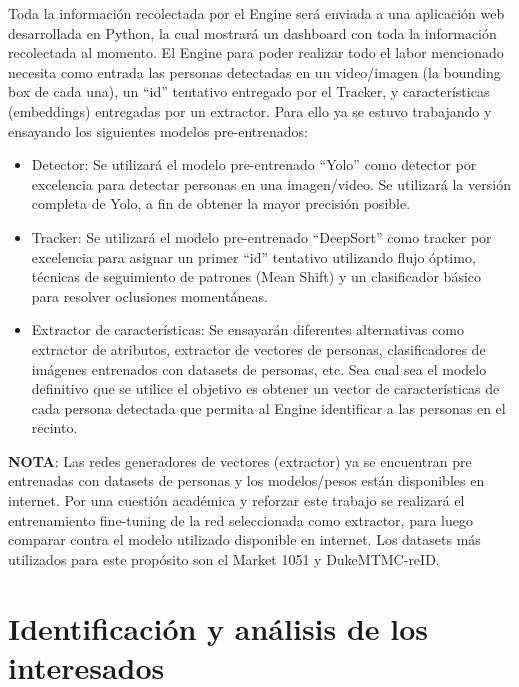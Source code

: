\documentclass[11pt]{charter}
\begin{document}
\newpage

Toda la información recolectada por el Engine será enviada a una aplicación web desarrollada en Python, la cual mostrará un dashboard con toda la información recolectada al momento. El Engine para poder realizar todo el labor mencionado necesita como entrada las personas detectadas en un video/imagen (la bounding box de cada una), un “id” tentativo entregado por el Tracker, y características (embeddings)  entregadas por un extractor. Para ello ya se estuvo trabajando y ensayando los siguientes modelos pre-entrenados:

\begin{itemize}
\item Detector: Se utilizará el modelo pre-entrenado “Yolo” como detector por excelencia para detectar personas en una imagen/video. Se utilizará la versión completa de Yolo, a fin de obtener la mayor precisión posible.
\item Tracker: Se utilizará el modelo pre-entrenado “DeepSort” como tracker por excelencia para asignar un primer “id” tentativo utilizando flujo óptimo, técnicas de seguimiento de patrones (Mean Shift) y un clasificador básico para resolver oclusiones momentáneas.
\item Extractor de características: Se ensayarán diferentes alternativas como extractor de atributos, extractor de vectores de personas, clasificadores de imágenes entrenados con datasets de personas, etc. Sea cual sea el modelo definitivo que se utilice el objetivo es obtener un vector de características de cada persona detectada que permita al Engine identificar a las personas en el recinto.
\end{itemize}

\textbf{NOTA}: Las redes generadores de vectores (extractor) ya se encuentran pre entrenadas con datasets de personas y los modelos/pesos están disponibles en internet. Por una cuestión académica y reforzar este trabajo se realizará el entrenamiento fine-tuning de la red seleccionada como extractor, para luego comparar contra el modelo utilizado disponible en internet. Los datasets más utilizados para este propósito son el Market 1051 y DukeMTMC-reID.


\section{Identificación y análisis de los interesados}
\label{sec:interesados}
\end{document}
